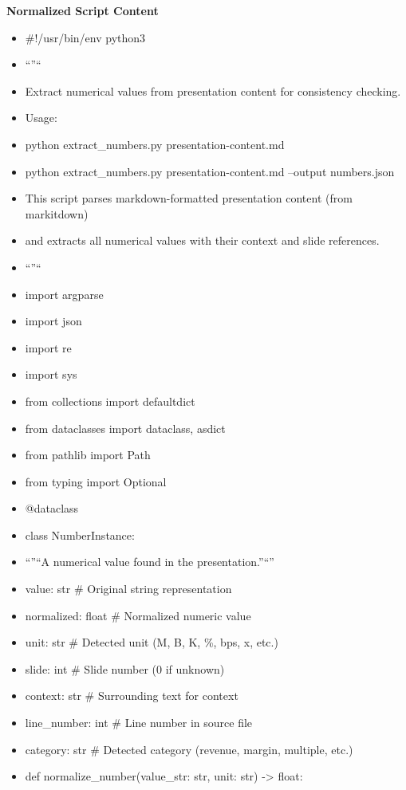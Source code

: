 \documentclass[11pt]{article}
\begin{document}
\textbf{Normalized Script Content}
\begin{itemize}[leftmargin=*,itemsep=2pt,topsep=2pt]
\item {} \#!/usr/bin/env python3
\item {} ``''``
\item {} Extract numerical values from presentation content for consistency checking.
\item {} Usage:
\item {} python extract\_\allowbreak{}numbers.py presentation-content.md
\item {} python extract\_\allowbreak{}numbers.py presentation-content.md --output numbers.json
\item {} This script parses markdown-formatted presentation content (from markitdown)
\item {} and extracts all numerical values with their context and slide references.
\item {} ``''``
\item {} import argparse
\item {} import json
\item {} import re
\item {} import sys
\item {} from collections import defaultdict
\item {} from dataclasses import dataclass, asdict
\item {} from pathlib import Path
\item {} from typing import Optional
\item {} @dataclass
\item {} class NumberInstance:
\item {} ``''``A numerical value found in the presentation.''``''
\item {} value: str \# Original string representation
\item {} normalized: float \# Normalized numeric value
\item {} unit: str \# Detected unit (M, B, K, \%, bps, x, etc.)
\item {} slide: int \# Slide number (0 if unknown)
\item {} context: str \# Surrounding text for context
\item {} line\_\allowbreak{}number: int \# Line number in source file
\item {} category: str \# Detected category (revenue, margin, multiple, etc.)
\item {} def normalize\_\allowbreak{}number(value\_\allowbreak{}str: str, unit: str) -> float:

\end{itemize}
\end{document}
